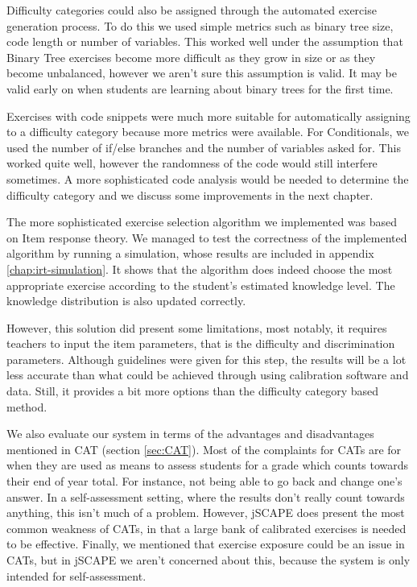 Difficulty categories could also be assigned through the automated exercise generation process. To do this we used simple metrics such as binary tree size, code length or number of variables. This worked well under the assumption that Binary Tree exercises become more difficult as they grow in size or as they become unbalanced, however we aren't sure this assumption is valid. It may be valid early on when students are learning about binary trees for the first time. \newline

Exercises with code snippets were much more suitable for automatically assigning to a difficulty category because more metrics were available. For Conditionals, we used the number of \textsf{if/else} branches and the number of variables asked for. This worked quite well, however the randomness of the code would still interfere sometimes. A more sophisticated code analysis would be needed to determine the difficulty category and we discuss some improvements in the next chapter.\newline

The more sophisticated exercise selection algorithm we implemented was based on Item response theory. We managed to test the correctness of the implemented algorithm by running a simulation, whose results are included in appendix \ref{chap:irt-simulation}. It shows that the algorithm does indeed choose the most appropriate exercise according to the student's estimated knowledge level. The knowledge distribution is also updated correctly.\newline

However, this solution did present some limitations, most notably, it requires teachers to input the item parameters, that is the difficulty and discrimination parameters. Although guidelines were given for this step, the results will be a lot less accurate than what could be achieved through using calibration software and data. Still, it provides a bit more options than the difficulty category based method. \newline

We also evaluate our system in terms of the advantages and disadvantages mentioned in CAT (section \ref{sec:CAT}). Most of the complaints for CATs are for when they are used as means to assess students for a grade which counts towards their end of year total. For instance, not being able to go back and change one's answer. In a self-assessment setting, where the results don't really count towards anything, this isn't much of a problem. However, jSCAPE does present the most common weakness of CATs, in that a large bank of calibrated exercises is needed to be effective. Finally, we mentioned that exercise exposure could be an issue in CATs, but in jSCAPE we aren't concerned about this, because the system is only intended for self-assessment.

